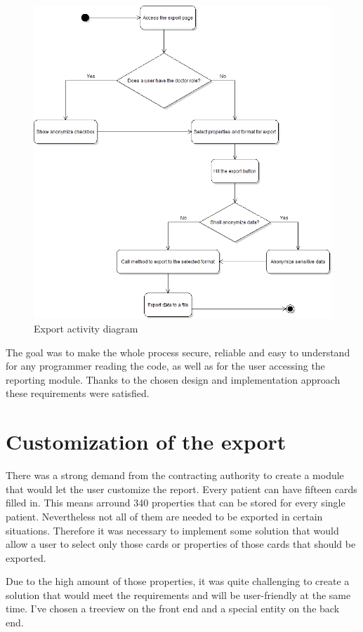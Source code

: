 \documentclass[thesis=B,english]{FITthesis}[2012/10/20]
\begin{document}
\begin{figure}[ht]\centering
\includegraphics[width=0.6\paperwidth]{exportDiagram}
		\caption{Export activity diagram}
\end{figure}

The goal was to make the whole process secure, reliable and easy to understand for any programmer reading the code, as well as for the user accessing the reporting module. Thanks to the chosen design and implementation approach these requirements were satisfied.
\section{Customization of the export}
There was a strong demand from the contracting authority to create a module that would let the user customize the report. Every patient can have fifteen cards filled in. This means arround 340 properties that can be stored for every single patient. Nevertheless not all of them are needed to be exported in certain situations. Therefore it was necessary to implement some solution that would allow a user to select only those cards or properties of those cards that should be exported.

Due to the high amount of those properties, it was quite challenging to create a solution that would meet the requirements and will be user-friendly at the same time. I've chosen a treeview on the front end and a special entity on the back end.
\end{document}
